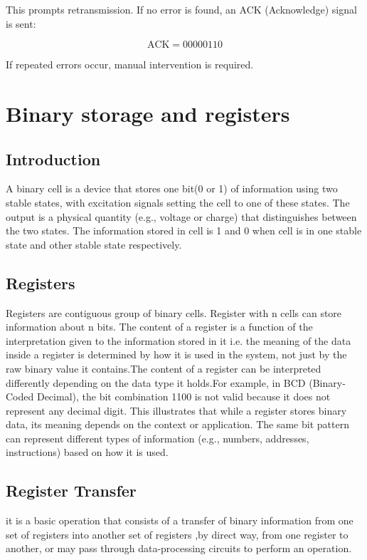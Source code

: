 \documentclass[a4paper,12pt]{article}
\begin{document}
This prompts retransmission. If no error is found, an ACK (Acknowledge) signal is sent:

\[
\text{ACK} = 00000110
\]

If repeated errors occur, manual intervention is required.

\newpage

\section{Binary storage and registers}

\subsection{Introduction}
A binary cell is a device that stores one bit(0 or 1) of information using two stable states, with excitation signals setting the cell to one of these states. The output is a physical quantity (e.g., voltage or charge) that distinguishes between the two states. The information stored in  cell is 1 and 0 when cell is in one stable state and other stable state respectively.

\subsection{Registers}
Registers are contiguous group of binary cells. Register with n cells can store information about n bits. The content of a register is a function of the interpretation given to the information stored in it i.e.  the meaning of the data inside a register is determined by how it is used in the system, not just by the raw binary value it contains.The content of a register can be interpreted differently depending on the data type it holds.For example, in BCD (Binary-Coded Decimal), the bit combination 1100 is not valid because it does not represent any decimal digit. This illustrates that while a register stores binary data, its meaning depends on the context or application. The same bit pattern can represent different types of information (e.g., numbers, addresses, instructions) based on how it is used.

\subsection{ Register Transfer}
it is a basic operation that consists of a transfer of binary information from one set of registers into another set of 
registers ,by direct way, from one register to another, or may pass through 
data-processing circuits to perform an operation. 
\end{document}
